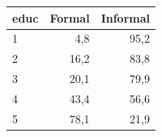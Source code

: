 \begin{tabular}{lrr}
\toprule
educ & Formal & Informal \\
\midrule
1 & 4,8 & 95,2 \\
2 & 16,2 & 83,8 \\
3 & 20,1 & 79,9 \\
4 & 43,4 & 56,6 \\
5 & 78,1 & 21,9 \\
\bottomrule
\end{tabular}

